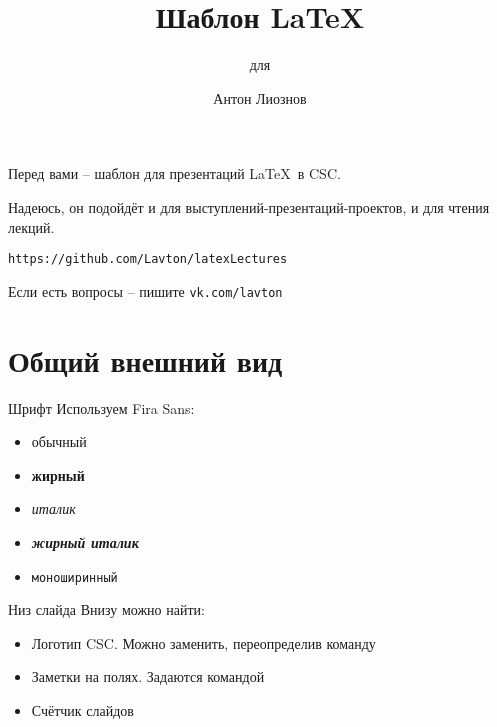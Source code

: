 \documentclass[12pt, aspectratio=43]{beamer}
\begin{document}
    \title{Шаблон \LaTeX}
    \subtitle{для \CSC}
    \author{Антон Лиознов}
    \institute{\CSC}
    \date{\the\year}
    \frame{\titlepage}
    \begin{frame}\relax
    Перед вами -- шаблон для презентаций \LaTeX\ в CSC. 
    
    Надеюсь, он подойдёт и для выступлений-презентаций-проектов, и для чтения лекций.
    
    \texttt{https://github.com/Lavton/latexLectures}
    
    Если есть вопросы -- пишите \texttt{vk.com/lavton}
    
    \end{frame}
    
    \section{Общий внешний вид}
    \begin{frame}{Шрифт}\relax
        Используем Fira Sans:
        \begin{itemize}
            \item обычный
            \item \textbf{жирный}
            \item \textit{италик}
            \item \textit{\textbf{жирный италик}}
            \item \texttt{моноширинный}
        \end{itemize}
    \end{frame}
    
    \begin{frame}{Низ слайда}\relax
        Внизу можно найти:
        \begin{itemize}
            \item Логотип CSC. Можно заменить, переопределив команду \texttt{\string\logoname}
            \item Заметки на полях. Задаются командой \texttt{\string\cscfootnote}
            \item Счётчик слайдов
             
        \end{itemize}
    \end{frame}
    
\end{document}
